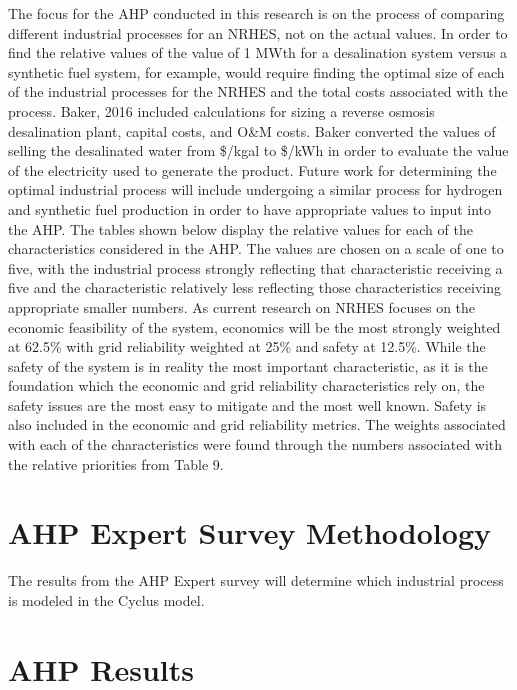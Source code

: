 \documentclass[12pt]{UIdahoMastersThesis}
\begin{document}
The focus for the AHP conducted in this research is on the process of comparing different industrial processes for an NRHES, not on the actual values. In order to find the relative values of the value of 1 MWth for a desalination system versus a synthetic fuel system, for example, would require finding the optimal size of each of the industrial processes for the NRHES and the total costs associated with the process.  Baker, 2016  included calculations for sizing a reverse osmosis desalination plant, capital costs, and O\&M costs.  Baker converted the values of selling the desalinated water from \$/kgal to \$/kWh in order to evaluate the value of the electricity used to generate the product. Future work for determining the optimal industrial process will include undergoing a similar process for hydrogen and synthetic fuel production in order to have appropriate values to input into the AHP.  The tables shown below display the relative values for each of the characteristics considered in the AHP. The values are chosen on a scale of one to five, with the industrial process strongly reflecting that characteristic receiving a five and the characteristic relatively less reflecting those characteristics receiving appropriate smaller numbers. As current research on NRHES focuses on the economic feasibility of the system, economics will be the most strongly weighted at 62.5\% with grid reliability weighted at 25\% and safety at 12.5\%.  While the safety of the system is in reality the most important characteristic, as it is the foundation which the economic and grid reliability characteristics rely on, the safety issues are the most easy to mitigate and the most well known. Safety is also included in the economic and grid reliability metrics. The weights associated with each of the characteristics were found through the numbers associated with the relative priorities from Table 9.

\section{AHP Expert Survey Methodology}
The results from the AHP Expert survey will determine which industrial process is modeled in the Cyclus model.
\section{AHP Results}
\end{document}

